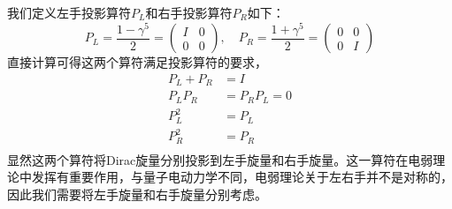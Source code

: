 我们定义左手投影算符$P_{L}$和右手投影算符$P_{R}$如下：
\begin{equation}
    P_{L}=\frac{1-\gamma^{5}}{2}=\left(\begin{array}{cc}
    I & 0 \\
    0 & 0
\end{array}\right),\quad P_{R}=\frac{1+\gamma^{5}}{2}=\left(\begin{array}{cc}
    0 & 0 \\
    0 & I
\end{array}\right)
\end{equation}
直接计算可得这两个算符满足投影算符的要求，
\begin{equation}
    \begin{aligned}
    P_{L}+P_{R}&=I\\
    P_{L}P_{R}&=P_{R}P_{L}=0\\
     P_{L}^{2}&=P_{L}\\
     P_{R}^{2}&=P_{R}\\
    \end{aligned}
\end{equation}
显然这两个算符将Dirac旋量分别投影到左手旋量和右手旋量。这一算符在电弱理论中发挥有重要作用，与量子电动力学不同，电弱理论关于左右手并不是对称的，因此我们需要将左手旋量和右手旋量分别考虑。

